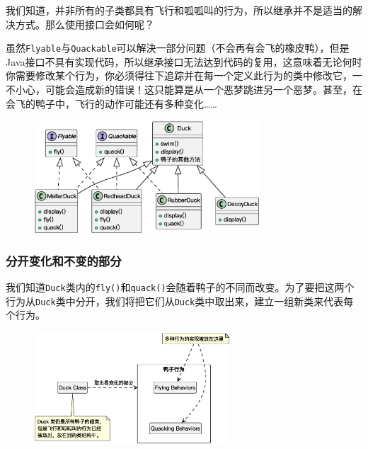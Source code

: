 我们知道，并非所有的子类都具有飞行和呱呱叫的行为，所以继承并不是适当的解决方式。那么使用接口会如何呢？

虽然\;\verb|Flyable|\;与\;\verb|Quackable|\;可以解決一部分问题（不会再有会飞的橡皮鸭），但是Java接口不具有实现代码，所以继承接口无法达到代码的复用，这意味着无论何时你需要修改某个行为，你必须得往下追踪并在每一个定义此行为的类中修改它，一不小心，可能会造成新的错误！这只能算是从一个恶梦跳进另一个恶梦。甚至，在会飞的鸭子中，飞行的动作可能还有多种变化……

\begin{figure}[H]
    \vspace{-0.5em}
	\centering
	\includegraphics[width=0.75\textwidth]{images/SimUDuck3.eps}
    \vspace{-1em}
\end{figure}

\subsubsection{分开变化和不变的部分}
我们知道\;\verb|Duck|\;类内的\;\verb|fly()|\;和\;\verb|quack()|\;会随着鸭子的不同而改变。为了要把这两个行为从\;\verb|Duck|\;类中分开，我们将把它们从\;\verb|Duck|\;类中取出来，建立一组新类来代表每个行为。
\begin{figure}[H]
    \vspace{-0.5em}
	\centering
	\includegraphics[width=0.65\textwidth]{images/SimUDuck4.eps}
    \vspace{-1em}
\end{figure}

